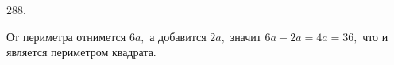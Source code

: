 288. \begin{center}
\begin{figure}[ht!]
\end{figure}
\end{center}
От периметра отнимется $6a,$ а добавится $2a,$ значит $6a-2a=4a=36,$ что и является периметром квадрата.\\
